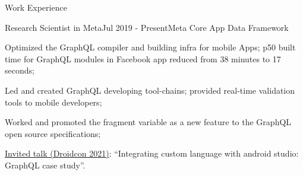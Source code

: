 \documentclass{resume} %
\begin{document}

\vspace{2em}
\begin{rSection}{Work Experience}
\begin{rSubsection}{Research Scientist in Meta}{Jul 2019 - Present}{Meta Core App Data Framework}{}
\item Optimized the GraphQL compiler and building infra for mobile Apps; p50 built time for GraphQL modules in Facebook app reduced from 38 minutes to 17 seconds;
\item Led and created GraphQL developing tool-chains; provided real-time validation tools to mobile developers;
\item Worked and promoted the fragment variable as a new feature to the GraphQL open source specifications;
\item \href{https://www.droidcon.com/2021/11/23/integrating-custom-language-with-android-studio-graphql-case-study/}{Invited talk (Droidcon 2021)}: ``Integrating custom language with android studio: GraphQL case study''.
\end{rSubsection}

\end{rSection}

\end{document}
